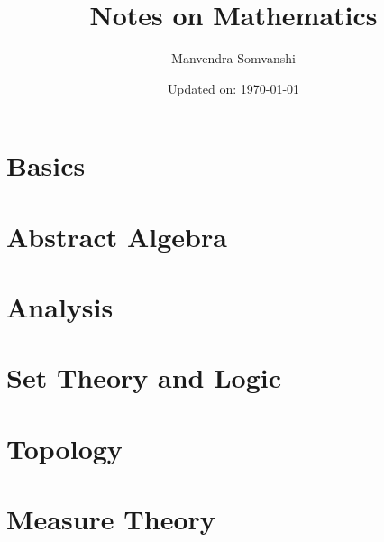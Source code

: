 \documentclass[11pt,a4paper]{colorart}
\numberwithin{equation}{section}
\begin{document}
\title{\Huge Notes on Mathematics}
\author{Manvendra Somvanshi} 
\date{Updated on: \today} 
\maketitle
\tableofcontents
\newpage
\part{Basics}




\newpage
\part{Abstract Algebra}









\newpage
\part{Analysis}







\newpage
\part{Set Theory and Logic}



\newpage
\part{Topology}

\newpage
\part{Measure Theory}






\end{document}

